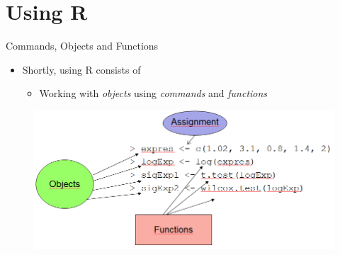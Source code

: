 \documentclass[
  ignorenonframetext,
]{beamer}
\providecommand{\tightlist}{%
  \setlength{\itemsep}{0pt}\setlength{\parskip}{0pt}}
\begin{document}
\hypertarget{using-r}{%
\section{Using R}\label{using-r}}

\begin{frame}{Commands, Objects and Functions}
\protect\hypertarget{commands-objects-and-functions}{}
\begin{itemize}
\tightlist
\item
  Shortly, using R consists of

  \begin{itemize}
  \tightlist
  \item
    Working with \emph{objects} using \emph{commands} and
    \emph{functions}
  \end{itemize}
\end{itemize}

\begin{figure}
\includegraphics[width=0.85\linewidth]{images/basicConcepts.png}
\end{figure}
\end{frame}
\end{document}
